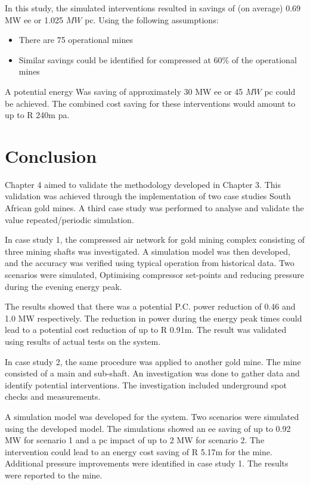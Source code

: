 In this study, the simulated interventions resulted in savings of (on average) 0.69 MW \gls{ee} or 1.025 $ MW $ \gls{pc}. Using the following assumptions:
\begin{itemize}
	\item There are 75 operational mines
	\item Similar savings could be identified for compressed at 60\% of the operational mines
\end{itemize} 
A potential energy Was saving of approximately 30 MW \gls{ee} or 45 $ MW $ \gls{pc} could be achieved. The combined cost saving for these interventions would amount to up to R 240m \gls{pa}. 
\clearpage
\section{Conclusion}
Chapter 4 aimed to validate the methodology developed in Chapter 3. This validation was achieved through the implementation of two case studies South African gold mines. A third case study was performed to analyse and validate the value repeated/periodic simulation.
\par 
In case study 1, the compressed air network for gold mining complex consisting of three mining shafts was investigated. A simulation model was then developed, and the accuracy was verified using typical operation from historical data. Two scenarios were simulated, Optimising compressor set-points and reducing pressure during the evening energy peak.
\par 
The results showed that there was a potential P.C. power reduction of 0.46 and 1.0 MW respectively. The reduction in power during the energy peak times could lead to a potential cost reduction of up to R 0.91m. The result was validated using results of actual tests on the system.
\par
In case study 2, the same procedure was applied to another gold mine.  The mine consisted of a main and sub-shaft. An investigation was done to gather data and identify potential interventions. The investigation included underground spot checks and measurements.
\par 
A simulation model was developed for the system. Two scenarios were simulated using the developed model. The simulations showed an \gls{ee} saving of up to 0.92 MW for scenario 1 and a \gls{pc} impact of up to 2 MW for scenario 2. The intervention could lead to an energy cost saving of R 5.17m for the mine. Additional pressure improvements were identified in case study 1. The results were reported to the mine.

